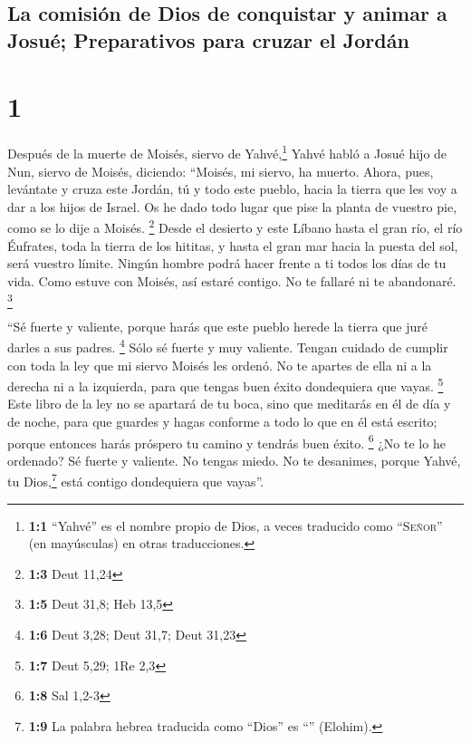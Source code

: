 \hypertarget{la-comisiuxf3n-de-dios-de-conquistar-y-animar-a-josuuxe9-preparativos-para-cruzar-el-jorduxe1n}{%
\subsection{La comisión de Dios de conquistar y animar a Josué;
Preparativos para cruzar el
Jordán}\label{la-comisiuxf3n-de-dios-de-conquistar-y-animar-a-josuuxe9-preparativos-para-cruzar-el-jorduxe1n}}

\hypertarget{section}{%
\section{1}\label{section}}

 Después de la muerte de Moisés, siervo de
Yahvé,\footnote{\textbf{1:1} ``Yahvé'' es el nombre propio de Dios, a
  veces traducido como ``\textsc{Señor}'' (en mayúsculas) en otras
  traducciones.} Yahvé habló a Josué hijo de Nun, siervo de Moisés,
diciendo:  ``Moisés, mi siervo, ha muerto. Ahora, pues,
levántate y cruza este Jordán, tú y todo este pueblo, hacia la tierra
que les voy a dar a los hijos de Israel.  Os he dado todo
lugar que pise la planta de vuestro pie, como se lo dije a Moisés.
\footnote{\textbf{1:3} Deut 11,24}  Desde el desierto y
este Líbano hasta el gran río, el río Éufrates, toda la tierra de los
hititas, y hasta el gran mar hacia la puesta del sol, será vuestro
límite.  Ningún hombre podrá hacer frente a ti todos los
días de tu vida. Como estuve con Moisés, así estaré contigo. No te
fallaré ni te abandonaré. \footnote{\textbf{1:5} Deut 31,8; Heb 13,5}

 ``Sé fuerte y valiente, porque harás que este pueblo
herede la tierra que juré darles a sus padres. \footnote{\textbf{1:6}
  Deut 3,28; Deut 31,7; Deut 31,23}  Sólo sé fuerte y muy
valiente. Tengan cuidado de cumplir con toda la ley que mi siervo Moisés
les ordenó. No te apartes de ella ni a la derecha ni a la izquierda,
para que tengas buen éxito dondequiera que vayas. \footnote{\textbf{1:7}
  Deut 5,29; 1Re 2,3}  Este libro de la ley no se apartará
de tu boca, sino que meditarás en él de día y de noche, para que guardes
y hagas conforme a todo lo que en él está escrito; porque entonces harás
próspero tu camino y tendrás buen éxito. \footnote{\textbf{1:8} Sal
  1,2-3}  ¿No te lo he ordenado? Sé fuerte y valiente. No
tengas miedo. No te desanimes, porque Yahvé, tu Dios,\footnote{\textbf{1:9}
  La palabra hebrea traducida como ``Dios'' es ``''
  (Elohim).} está contigo dondequiera que vayas''.

